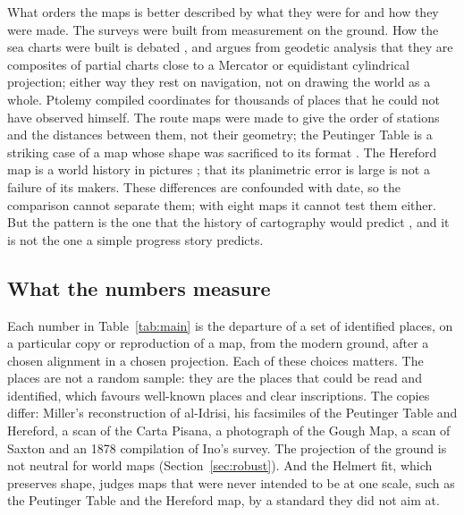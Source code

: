 \documentclass[11pt,a4paper]{article}
\begin{document}
What orders the maps is better described by what they were for and how they were made. The surveys were built from measurement on the ground. How the sea charts were built is debated \citep{campbell1987}, and \citet{nicolai2016} argues from geodetic analysis that they are composites of partial charts close to a Mercator or equidistant cylindrical projection; either way they rest on navigation, not on drawing the world as a whole. Ptolemy compiled coordinates for thousands of places that he could not have observed himself. The route maps were made to give the order of stations and the distances between them, not their geometry; the Peutinger Table is a striking case of a map whose shape was sacrificed to its format \citep{talbert2010}. The Hereford map is a world history in pictures \citep{woodward1985,harvey1996}; that its planimetric error is large is not a failure of its makers. These differences are confounded with date, so the comparison cannot separate them; with eight maps it cannot test them either. But the pattern is the one that the history of cartography would predict \citep{harley1987,edney2019}, and it is not the one a simple progress story predicts.

\subsection{What the numbers measure}
Each number in Table~\ref{tab:main} is the departure of a set of identified places, on a particular copy or reproduction of a map, from the modern ground, after a chosen alignment in a chosen projection. Each of these choices matters. The places are not a random sample: they are the places that could be read and identified, which favours well-known places and clear inscriptions. The copies differ: Miller's reconstruction of al-Idrisi, his facsimiles of the Peutinger Table and Hereford, a scan of the Carta Pisana, a photograph of the Gough Map, a scan of Saxton and an 1878 compilation of Ino's survey. The projection of the ground is not neutral for world maps (Section~\ref{sec:robust}). And the Helmert fit, which preserves shape, judges maps that were never intended to be at one scale, such as the Peutinger Table and the Hereford map, by a standard they did not aim at.
\end{document}
